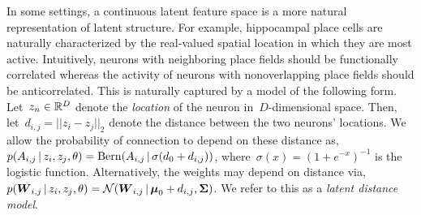 In some settings, a continuous latent feature space is a more natural representation of latent structure. 
For example, hippocampal place cells are naturally characterized by the real-valued spatial location in which they are most active. 
Intuitively, neurons with neighboring place fields should be functionally correlated whereas the activity of neurons with nonoverlapping place fields should be anticorrelated.
This is naturally captured by a model of the following form.
Let~$z_n \in \mathbb{R}^D$ denote the \emph{location} of the neuron in~$D$-dimensional space. 
Then, let~${d_{i,j} = ||z_i - z_j||_2}$ denote the distance between the two neurons' locations.
We allow the probability of connection to depend on these distance as,
${p(A_{i,j} \,|\, z_i, z_j, \theta) = \mathrm{Bern}(A_{i,j} \,|\, \sigma(d_0 + d_{i,j}))}$,
where~${\sigma(x)=(1+e^{-x})^{-1}}$ is the logistic function.
Alternatively, the weights may depend on distance via,
${p(\boldsymbol{W}_{i,j} \,|\, z_i, z_j, \theta) = \mathcal{N}(\boldsymbol{W}_{i,j} \,|\, \boldsymbol{\mu}_0 + d_{i,j}, \boldsymbol{\Sigma})}$.
We refer to this as a \emph{latent distance model}.



